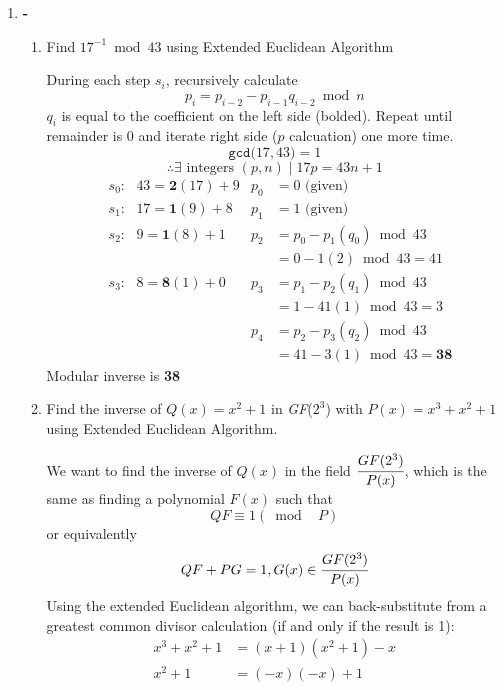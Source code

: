 \documentclass[12pt]{article}
\newenvironment{answer}
{ \begin{tcolorbox}[halign=left]
    }
    {  
  \end{tcolorbox}
}
\begin{document}
\begin{enumerate}
\item \textbf{-}
  \begin{enumerate}
  \item Find $17^{-1} \bmod 43$ using Extended Euclidean Algorithm
    \begin{answer}
      During each step $s_i$, recursively calculate  
      \[p_i = p_{i-2} - p_{i-1}q_{i-2} \bmod n \]
      $q_i$ is equal to the coefficient on the left side (bolded). Repeat until remainder is 0 and iterate right side ($p$ calcuation) one more time.
      \[\texttt{gcd(}17,43\texttt{)} = 1 \]
      \[ \therefore \text{$\exists$ integers $(p,n) \mid 17p = 43n + 1$} \]
      \begin{align*}
        &s_0: \text{  }43 = \bm{2}(17) + 9 &p_0 &= 0 \text{ (given)}\\
        &s_1: \text{  }17 = \bm{1}(9) + 8 &p_1 &= 1 \text{ (given)}\\
        &s_2: \text{  }9 = \bm{1}(8) + 1 &p_2 &= p_0 - p_1(q_0) \bmod 43 \\ 
        & & &= 0 - 1(2) \bmod 43 = 41 \\
        &s_3: \text{  }8 = \bm{8}(1) + 0 &p_3 &= p_1 - p_2(q_1) \bmod 43 \\
        & & &= 1 - 41(1) \bmod 43 = 3 \\
        & &p_4 &= p_2 - p_3(q_2) \bmod 43 \\
        & & &= 41 - 3(1) \bmod 43 = \bm{38}
      \end{align*}
      Modular inverse is \textbf{38}
    \end{answer}
    \newpage
  \item Find the inverse of $Q(x) = x^2 + 1$ in \textit{GF}($2^3$) with $P(x) = x^3 + x^2 + 1$ using Extended Euclidean Algorithm.
        \begin{answer}
          We want to find the inverse of $Q(x)$ in the field $\cfrac{GF(2^3)}{P(x)}$, which is the same as finding a polynomial $F(x)$ such that 
          \[ QF \equiv 1 (\bmod \text{ }P) \]
          or equivalently
          \[ QF + PG = 1,  G(x) \in \cfrac{GF(2^3)}{P(x)} \]
          Using the extended Euclidean algorithm, we can back-substitute from a greatest common divisor calculation (if and only if the result is 1):
          \begin{align*}
            x^3 + x^2 + 1 &= (x+1)(x^2 + 1) - x \\
            x^2 + 1 &= (-x)(-x) + 1 \\ 
          \end{align*}
          \begin{align*}

\end{align*}
\end{answer}
\end{enumerate}
\end{enumerate}
\end{document}
